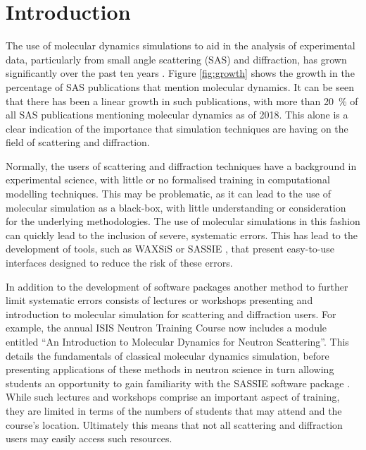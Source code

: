 \documentclass[amsmath,amssymb,twocolumn,superscriptaddress]{revtex4-1}
\begin{document}
\section{Introduction}

\noindent The use of molecular dynamics simulations to aid in the analysis of experimental data, particularly from small angle scattering (SAS) and diffraction, has grown significantly over the past ten years \cite{pan_molecular_2012,boldon_review_2015,hub_interpreting_2018,ivanovic_temperature-dependent_2018,east_structural_2016,wall_conformational_2014,wall_internal_2018,satoh_multiple_2015}.
Figure \ref{fig:growth} shows the growth in the percentage of SAS publications that mention molecular dynamics.
It can be seen that there has been a linear growth in such publications, with more than \SI{20}{\percent} of all SAS publications mentioning molecular dynamics as of 2018.
This alone is a clear indication of the importance that simulation techniques are having on the field of scattering and diffraction.

Normally, the users of scattering and diffraction techniques have a background in experimental science, with little or no formalised training in computational modelling techniques.
This may be problematic, as it can lead to the use of molecular simulation as a black-box, with little understanding or consideration for the underlying methodologies.
The use of molecular simulations in this fashion can quickly lead to the inclusion of severe, systematic errors.
This has lead to the development of tools, such as WAXSiS or SASSIE \cite{chen_validating_2014,knight_waxsis_2015,perkins_atomistic_2016}, that present easy-to-use interfaces designed to reduce the risk of these errors.

In addition to the development of software packages another method to further limit systematic errors consists of lectures or workshops presenting and introduction to molecular simulation for scattering and diffraction users.
For example, the annual ISIS Neutron Training Course now includes a module entitled ``An Introduction to Molecular Dynamics for Neutron Scattering''.
This details the fundamentals of classical molecular dynamics simulation, before presenting applications of these methods in neutron science in turn allowing students an opportunity to gain familiarity with the SASSIE software package \cite{perkins_atomistic_2016}.
While such lectures and workshops comprise an important aspect of training, they are limited in terms of the numbers of students that may attend and the course's location.
Ultimately this means that not all scattering and diffraction users may easily access such resources.
\end{document}
